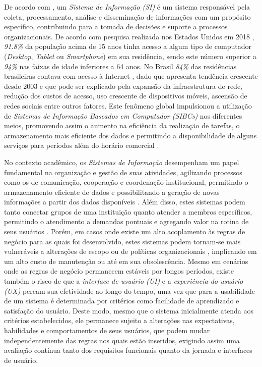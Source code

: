 \documentclass[nonacm, sigconf]{acmart}
\begin{document}
De acordo com \cite{rainer2015introdução}, um \textit{Sistema de Informação (SI)} é um sistema responsável pela coleta, processamento, análise e disseminação de informações com um propósito específico, contribuindo para a tomada de decisões e suporte a processos organizacionais. De acordo com pesquisa realizada nos Estados Unidos em 2018 \cite{martin2021computer}, \textit{91.8\%} da população acima de 15 anos tinha acesso a algum tipo de computador (\textit{Desktop}, \textit{Tablet} ou \textit{Smartphone}) em sua residência, sendo este número superior a \textit{94\%} nas faixas de idade inferiores a 64 anos. No Brasil \textit{84\%} das residências brasileiras contava com acesso à Internet \cite{ticbr2023}, dado que apresenta tendência crescente desde 2003 e que pode ser explicado pela expansão da infraestrutura de rede, redução dos custos de acesso, uso crescente de dispositivos móveis, ascensão de redes sociais entre outros fatores. Este fenômeno global impulsionou a utilização de \textit{Sistemas de Informação Baseados em Computador (SIBCs)} nos diferentes meios, promovendo assim o aumento na eficiência da realização de tarefas, o armazenamento mais eficiente dos dados e permitindo a disponibilidade de alguns serviços para períodos além do horário comercial \cite{katarina2015}.

No contexto acadêmico, os \textit{Sistemas de Informação} desempenham um papel fundamental na organização e gestão de suas atividades, agilizando processos como os de comunicação, cooperação e coordenação institucional, permitindo o armazenamento eficiente de dados e possibilitando a geração de novas informações a partir dos dados disponíveis \cite{murdick1984information}. Além disso, estes sistemas podem tanto conectar grupos de uma instituição quanto atender a membros específicos, permitindo o atendimento a demandas pontuais e agregando valor na rotina de seus usuários \cite{rainer2015introdução}. Porém, em casos onde existe um alto acoplamento às regras de negócio para as quais foi desenvolvido, estes sistemas podem tornam-se mais vulneráveis a alterações de escopo ou de políticas organizacionais \cite{sis}, implicando em um alto custo de manutenção ou até em sua obsolescência. Mesmo em cenários onde as regras de negócio permanecem estáveis por longos períodos, existe também o risco de que a \textit{interface de usuário (UI)} e a \textit{experiência do usuário (UX)} percam sua efetividade ao longo do tempo, uma vez que para \cite{nielsen1994usability} a usabilidade de um sistema é determinada por critérios como facilidade de aprendizado e satisfação do usuário. Deste modo, mesmo que o sistema inicialmente atenda aos critérios estabelecidos, ele permanece sujeito a alterações nas expectativas, habilidades e comportamentos de seus usuários, que podem mudar independentemente das regras nos quais estão inseridos, exigindo assim uma avaliação contínua tanto dos requisitos funcionais quanto da jornada e interfaces de usuário.
\end{document}
